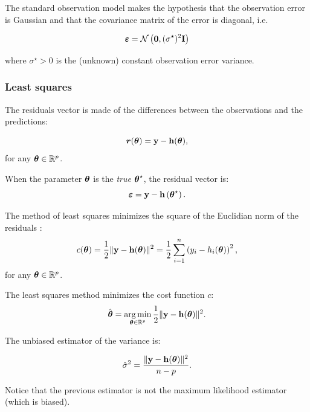 \documentclass{beamer}
\begin{document}

\begin{frame}
The standard observation model makes the hypothesis that the 
observation error is Gaussian and that the covariance
matrix of the error is diagonal, i.e.

$$
\boldsymbol{\varepsilon} = \mathcal{N}\left({\bf 0}, (\sigma^\star)^2 {\bf I}\right)
$$

where $\sigma^\star > 0$ is the (unknown) constant observation error
variance.

\end{frame}


\begin{frame}
\frametitle{Least squares}

The residuals vector is made of the differences between the observations 
and the predictions:

$$
\boldsymbol{r}(\boldsymbol{\theta}) = {\bf y} - {\bf h}(\boldsymbol{\theta}),
$$
for any $\boldsymbol{\theta} \in\mathbb{R}^p$. 

When the parameter $\boldsymbol{\theta}$ is the \emph{true} $\boldsymbol{\theta}^\star$, the residual 
vector is:
$$
\boldsymbol{\varepsilon} = {\bf y} - {\bf h}\left(\boldsymbol{\theta}^\star\right).
$$


The method of least squares minimizes the square
of the Euclidian norm of the residuals \cite{Bjorck1996}:
$$
c(\boldsymbol{\theta}) 
= \frac{1}{2} \|{\bf y} - {\bf h}(\boldsymbol{\theta})\|^2 
= \frac{1}{2} \sum_{i=1}^n \left( y_i - h_i(\boldsymbol{\theta}) \right)^2,
$$
for any $\boldsymbol{\theta} \in \mathbb{R}^p$.


\end{frame}


\begin{frame}
The least squares method minimizes the cost function $c$:
$$
\hat{\boldsymbol{\theta}} 
= \operatorname*{arg\,min}_{\boldsymbol{\theta} \in \mathbb{R}^p} \frac{1}{2} \|{\bf y} - {\bf h}(\boldsymbol{\theta})\|^2.
$$

The unbiased estimator of the variance is:

$$
\hat{\sigma}^2 = \frac{\|{\bf y} - {\bf h}(\boldsymbol{\theta})\|^2}{n - p}.
$$

Notice that the previous estimator is not the maximum likelihood
estimator (which is biased).
\end{frame}

\end{document}

